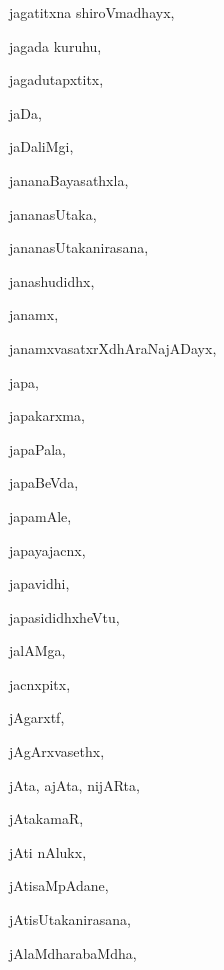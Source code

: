 \begin{multicols}{3}
{\noindent
{jagatitxna shiroVmadhayx}, \pageref{jagatitxna shiroVmadhayx}

\noindent
{jagada kuruhu}, \pageref{jagada kuruhu}

\noindent
{jagadutapxtitx}, \pageref{jagadutapxtitx}

\noindent
{jaDa}, \pageref{jaDa}

\noindent
{jaDaliMgi}, \pageref{jaDaliMgi}

\noindent
{jananaBayasathxla}, \pageref{jananaBayasathxla}

\noindent
{jananasUtaka}, \pageref{jananasUtaka}

\noindent
{jananasUtakanirasana}, \pageref{jananasUtakanirasana}

\noindent
{janashudidhx}, \pageref{janashudidhx}

\noindent
{janamx}, \pageref{janamx}

\noindent
{janamxvasatxrXdhAraNajADayx}, \pageref{janamxvasatxrXdhAraNajADayx}

\noindent
{japa}, \pageref{japa}

\noindent
{japakarxma}, \pageref{japakarxma}

\noindent
{japaPala}, \pageref{japaPala}

\noindent
{japaBeVda}, \pageref{japaBeVda}

\noindent
{japamAle}, \pageref{japamAle}

\noindent
{japayajacnx}, \pageref{japayajacnx}

\noindent
{japavidhi}, \pageref{japavidhi}

\noindent
{japasididhxheVtu}, \pageref{japasididhxheVtu}

\noindent
{jalAMga}, \pageref{jalAMga}

\noindent
{jacnxpitx}, \pageref{jacnxpitx}

\noindent
{jAgarxtf}, \pageref{jAgarxtf}

\noindent
{jAgArxvasethx}, \pageref{jAgArxvasethx}

\noindent
{jAta, ajAta, nijARta}, \pageref{jAta, ajAta, nijARta}

\noindent
{jAtakamaR}, \pageref{jAtakamaR}

\noindent
{jAti nAlukx}, \pageref{jAti nAlukx}

\noindent
{jAtisaMpAdane}, \pageref{jAtisaMpAdane}

\noindent
{jAtisUtakanirasana}, \pageref{jAtisUtakanirasana}

\noindent
{jAlaMdharabaMdha}, \pageref{jAlaMdharabaMdha}

}
\end{multicols}
